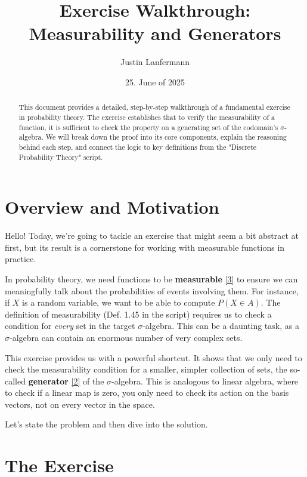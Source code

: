 \documentclass[11pt,a4paper]{article}
\title{\bfseries Exercise Walkthrough: Measurability and Generators}
\author{Justin Lanfermann}
\date{25. June of 2025}
\theoremstyle{exercise_style}
\theoremstyle{definition}
\begin{document}
\maketitle

\begin{abstract}
    This document provides a detailed, step-by-step walkthrough of a fundamental exercise in probability theory. The exercise establishes that to verify the measurability of a function, it is sufficient to check the property on a generating set of the codomain's $\sigma$-algebra. We will break down the proof into its core components, explain the reasoning behind each step, and connect the logic to key definitions from the "Discrete Probability Theory" script.
\end{abstract}

\tableofcontents
\newpage

\section{Overview and Motivation}

Hello! Today, we're going to tackle an exercise that might seem a bit abstract at first, but its result is a cornerstone for working with measurable functions in practice.

In probability theory, we need functions to be \textbf{measurable} \hyperlink{concept:measurable_function}{[3]} to ensure we can meaningfully talk about the probabilities of events involving them. For instance, if $X$ is a random variable, we want to be able to compute $P(X \in A)$. The definition of measurability (Def. 1.45 in the script) requires us to check a condition for \textit{every} set in the target $\sigma$-algebra. This can be a daunting task, as a $\sigma$-algebra can contain an enormous number of very complex sets.

This exercise provides us with a powerful shortcut. It shows that we only need to check the measurability condition for a smaller, simpler collection of sets, the so-called \textbf{generator} \hyperlink{concept:generator}{[2]} of the $\sigma$-algebra. This is analogous to linear algebra, where to check if a linear map is zero, you only need to check its action on the basis vectors, not on every vector in the space.

Let's state the problem and then dive into the solution.

\section{The Exercise}
\end{document}
